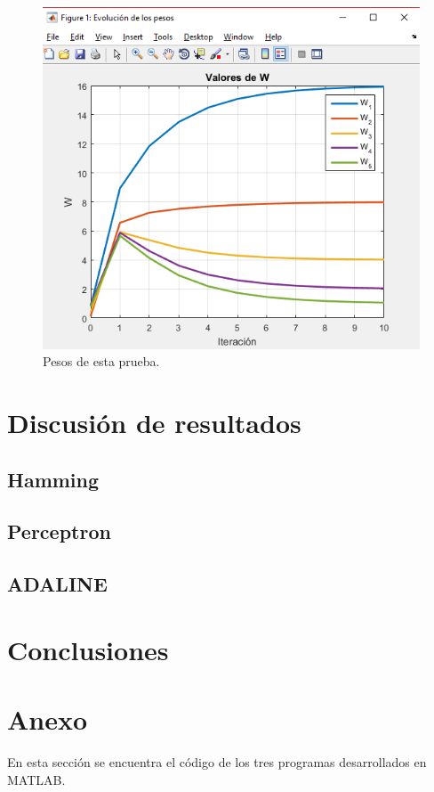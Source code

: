\documentclass[12pt, titlepage]{article}
\begin{document}
        \begin{figure}[H]
            \begin{center}
                \includegraphics[width=16cm]{img/adaline4/pesosbias.png}
                \caption{Pesos de esta prueba.}
                \label{fig:adaline4pesos}
            \end{center}
        \end{figure}
    \section{Discusión de resultados}
        \subsection{Hamming}
        \subsection{Perceptron}
        \subsection{ADALINE}
    \section{Conclusiones}
    
    
    \section{Anexo}
        En esta sección se encuentra el código de los tres programas desarrollados en MATLAB.
\end{document}
